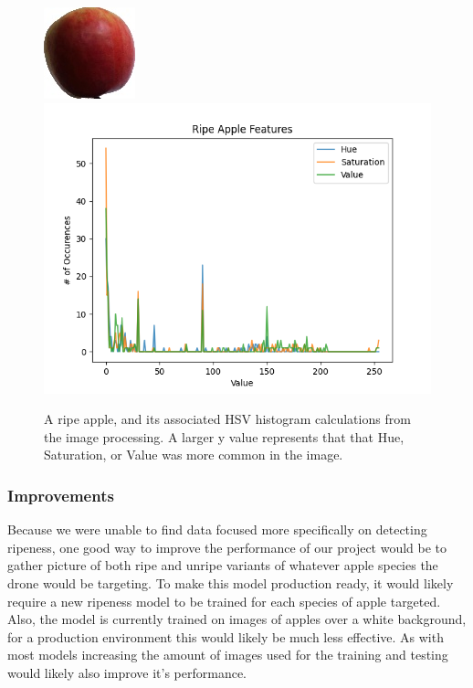 \begin{figure}[!htb]
    \fontsize{7}{5}\selectfont
    \centering
    \includegraphics[scale=0.7]
    {figures/Ripe Apple Example.jpg}
    \includegraphics[scale=.5]
    {figures/ripeness_features.png}
    \label{Ripe Apple Example}
    \caption{
        A ripe apple, and its associated HSV histogram calculations from the image processing. A larger y value represents that that Hue, Saturation, or Value was more common in the image.
    }
\end{figure}

\subsubsection{Improvements}
Because we were unable to find data focused more specifically on detecting ripeness, 
one good way to improve the performance of our project would be to gather picture of both ripe and unripe variants of 
whatever apple species the drone would be targeting. 
To make this model production ready, it would likely require a new ripeness model to be trained for each species of apple targeted.
Also, the model is currently trained on images of apples over a white background, for a production environment this would likely be much less effective.
As with most models increasing the amount of images used for the training and testing would likely also improve it's performance.
